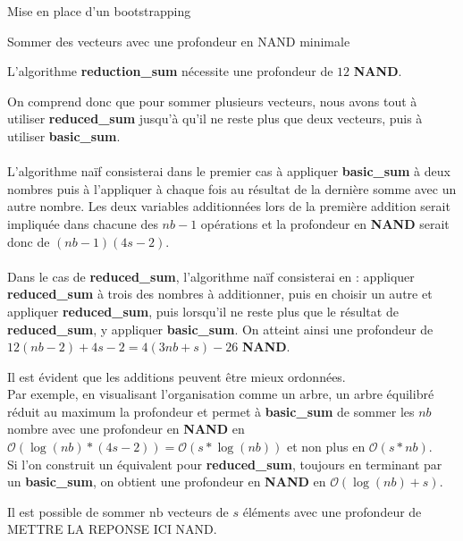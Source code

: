\begin{section}{Mise en place d'un bootstrapping}
\begin{subsection}{Sommer des vecteurs avec une profondeur en NAND minimale}
\begin{prop}
	L'algorithme \textbf{reduction\_sum} nécessite une profondeur de $12$ \textbf{NAND}.
\end{prop}

On comprend donc que pour sommer plusieurs vecteurs, nous avons tout à utiliser 
\textbf{reduced\_sum} jusqu'à qu'il ne reste plus que deux vecteurs, puis à
utiliser \textbf{basic\_sum}.



\paragraph{}
L'algorithme naïf consisterai dans le premier cas à appliquer
	\textbf{basic\_sum} à deux nombres puis à l'appliquer à chaque fois au
	résultat de la dernière somme avec un autre nombre. Les deux variables
	additionnées lors de la première addition serait impliquée dans chacune
	des $nb-1$ opérations et la profondeur en \textbf{NAND} serait donc de
	$(nb-1)(4 s - 2)$. 
\paragraph{}
Dans le cas de \textbf{reduced\_sum}, l'algorithme naïf consisterai en :
	appliquer \textbf{reduced\_sum} à trois des nombres à additionner, puis
	en choisir un autre et appliquer \textbf{reduced\_sum}, puis lorsqu'il
	ne reste plus que le résultat de \textbf{reduced\_sum}, y appliquer
	\textbf{basic\_sum}. On atteint ainsi une profondeur de $12(nb - 2) + 4
	s- 2 = 4(3nb + s) - 26$ \textbf{NAND}.

Il est évident que les additions peuvent être mieux ordonnées. \\
Par exemple, en visualisant l'organisation comme un arbre, un arbre équilibré
	réduit au maximum la profondeur et permet à \textbf{basic\_sum} de
	sommer les $nb$ nombre avec une profondeur en \textbf{NAND} en
	$\mathcal{O}(\log(nb) * (4s - 2)) = \mathcal{O}(s * \log(nb))$ et non
	plus en $\mathcal{O}(s * nb)$. \\
Si l'on construit un équivalent pour \textbf{reduced\_sum}, toujours en
terminant par un \textbf{basic\_sum}, on obtient une profondeur en
\textbf{NAND} en $\mathcal{O}(\log(nb) + s)$.

\begin{prop}
	Il est possible de sommer $\text{nb}$ vecteurs de $s$ éléments avec une
	profondeur de METTRE LA REPONSE ICI NAND.
\end{prop}


\end{subsection}
\end{section}
